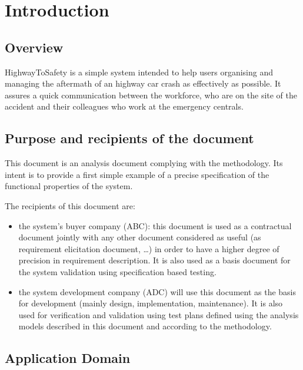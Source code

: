 
\chapter{Introduction}
\label{chap:introduction}

\section{Overview}
HighwayToSafety is a simple system intended to help users organising and
managing the aftermath of an highway car crash as effectively as possible. It
assures a quick communication between the workforce, who are on the site of the
accident and their colleagues who work at the emergency centrals.

\section{Purpose and recipients of the document}
This document is an analysis document complying with the 
methodology. Its intent is to provide a first simple example of a precise
specification of the functional properties of the  system.
\newline

The recipients of this document are:

\begin{itemize}

\item the  system's buyer company (ABC): this document is used as a
contractual document jointly with any other document considered as useful (as
requirement elicitation document, \ldots) in order to have a higher degree of
precision in requirement description. It is also used as a basis document
for the  system validation using specification based testing.
\item the  system development company (ADC) will use this document as
the basis for development (mainly design, implementation, maintenance). It is
also used for verification and validation using test plans defined using the
analysis models described in this document and according to the  methodology.
 
\end{itemize} 
 
\section{Application Domain}

